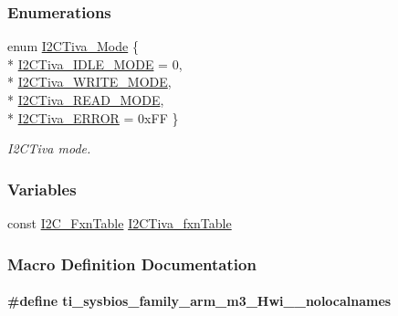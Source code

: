 \subsubsection*{Enumerations}
\begin{DoxyCompactItemize}
\item 
enum \hyperlink{_i2_c_tiva_8h_ab6fdad6d12d7ec02e2acb6fbc1ab85af}{I2\+C\+Tiva\+\_\+\+Mode} \{ \\*
\hyperlink{_i2_c_tiva_8h_ab6fdad6d12d7ec02e2acb6fbc1ab85afaa06bbe8186dddfc847f56bcad723e8c4}{I2\+C\+Tiva\+\_\+\+I\+D\+L\+E\+\_\+\+M\+O\+D\+E} = 0, 
\\*
\hyperlink{_i2_c_tiva_8h_ab6fdad6d12d7ec02e2acb6fbc1ab85afa22ae426fd1e9ff0e4c017f92b1c92ee8}{I2\+C\+Tiva\+\_\+\+W\+R\+I\+T\+E\+\_\+\+M\+O\+D\+E}, 
\\*
\hyperlink{_i2_c_tiva_8h_ab6fdad6d12d7ec02e2acb6fbc1ab85afaf35ad0158f701dd6310f4e525e8e3ae2}{I2\+C\+Tiva\+\_\+\+R\+E\+A\+D\+\_\+\+M\+O\+D\+E}, 
\\*
\hyperlink{_i2_c_tiva_8h_ab6fdad6d12d7ec02e2acb6fbc1ab85afaf016c90849ab8b94d1c6a4dddaf3a498}{I2\+C\+Tiva\+\_\+\+E\+R\+R\+O\+R} = 0x\+F\+F
 \}
\begin{DoxyCompactList}\small\item\em I2\+C\+Tiva mode. \end{DoxyCompactList}\end{DoxyCompactItemize}
\subsubsection*{Variables}
\begin{DoxyCompactItemize}
\item 
const \hyperlink{struct_i2_c___fxn_table}{I2\+C\+\_\+\+Fxn\+Table} \hyperlink{_i2_c_tiva_8h_aa37c457a45a8fa5451616bdb9cb5ce49}{I2\+C\+Tiva\+\_\+fxn\+Table}
\end{DoxyCompactItemize}


\subsubsection{Macro Definition Documentation}
\paragraph[{ti\+\_\+sysbios\+\_\+family\+\_\+arm\+\_\+m3\+\_\+\+Hwi\+\_\+\+\_\+nolocalnames}]{\setlength{\rightskip}{0pt plus 5cm}\#define ti\+\_\+sysbios\+\_\+family\+\_\+arm\+\_\+m3\+\_\+\+Hwi\+\_\+\+\_\+nolocalnames}\label{_i2_c_tiva_8h_aaa17ecf48f5762e2e1bdb0bab8aacf0c}


